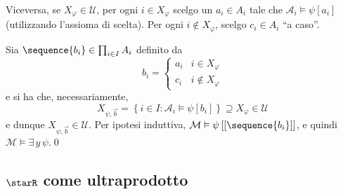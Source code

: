 {\begin{itemize}
\begin{itemize}
            Viceversa, se $ X_{\varphi} \in \mathcal{U}$, per ogni $ i \in  X_{\varphi}  $ scelgo un $ a_{i} \in A_{i}$ tale che $ \mathcal{A}_i \vDash \psi[a_{i} ]$ (utilizzando l'assioma di scelta). Per ogni $ i \notin X_{\varphi}  $, scelgo $ c_{i} \in A_{i}$ ``a caso''. 

            Sia $ \sequence{b_{i} } \in \prod_{i \in I}A_{i}$ definito da \[
                b_{i}  = \begin{cases}
                    a_{i} & i \in X_{\varphi}\\ 
                    c_{i} & i \notin X_{\varphi}     
                \end{cases} 
            \]e si ha che, necessariamente, \[
                X_{\psi,\vec{b}} = \left\{i \in I: \mathcal{A}_i\vDash \psi\left[b_{i} \right]\right\} \supseteq X_{\varphi} \in \mathcal{U}
            \]e dunque $ X_{\psi,\vec{b}} \in \mathcal{U}  $. Per ipotesi induttiva, $ \mathcal{M}\vDash\psi\left[\left[\sequence{b_{i} }\right]\right] $, e quindi $ \mathcal{M}\vDash \exists\, y\,\psi $.\qed
        \end{itemize}
    \end{itemize}
}
\subsection{$ \starR $ come ultraprodotto}

